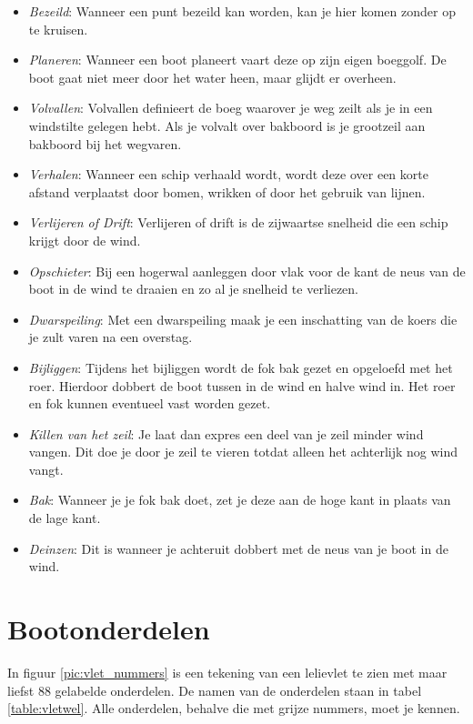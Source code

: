 \begin{itemize}
	
	\item \textit{Bezeild}: Wanneer een punt bezeild kan worden, kan je hier komen zonder op te kruisen. 
	\item \textit{Planeren}: Wanneer een boot planeert vaart deze op zijn eigen boeggolf. De boot gaat niet meer door het water heen, maar glijdt er overheen. 
	\item \textit{Volvallen}: Volvallen definieert de boeg waarover je weg zeilt als je in een windstilte gelegen hebt. Als je volvalt over bakboord is je grootzeil aan bakboord bij het wegvaren.
	\item \textit{Verhalen}: Wanneer een schip verhaald wordt, wordt deze over een korte afstand verplaatst door bomen, wrikken of door het gebruik van lijnen.
	\item \textit{Verlijeren of Drift}: Verlijeren of drift is de zijwaartse snelheid die een schip krijgt door de wind. 	
	\item \textit{Opschieter}: Bij een hogerwal aanleggen door vlak voor de kant de neus van de boot in de wind te draaien en zo al je snelheid te verliezen.
	\item \textit{Dwarspeiling}: Met een dwarspeiling maak je een inschatting van de koers die je zult varen na een overstag.
	\item \textit{Bijliggen}: Tijdens het bijliggen wordt de fok bak gezet en opgeloefd met het roer. Hierdoor dobbert de boot tussen in de wind en halve wind in. Het roer en fok kunnen eventueel vast worden gezet.
	\item \textit{Killen van het zeil}: Je laat dan expres een deel van je zeil minder wind vangen. Dit doe je door je zeil te vieren totdat alleen het achterlijk nog wind vangt.
	\item \textit{Bak}: Wanneer je je fok bak doet, zet je deze aan de hoge kant in plaats van de lage kant.
	\item \textit{Deinzen}: Dit is wanneer je achteruit dobbert met de neus van je boot in de wind.
\end{itemize}


\section{Bootonderdelen}
In figuur \ref{pic:vlet_nummers} is een tekening van een lelievlet te zien met maar liefst 88 gelabelde onderdelen. De namen van de onderdelen staan in tabel \ref{table:vletwel}. Alle onderdelen, behalve die met grijze nummers, moet je kennen.

